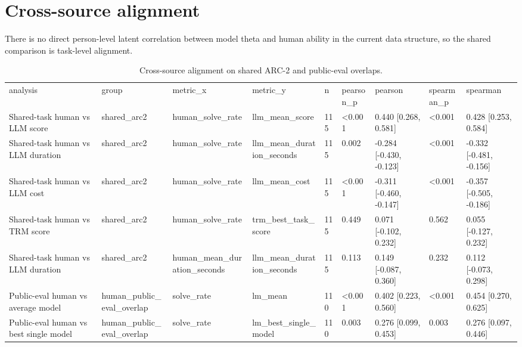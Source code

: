 \documentclass[11pt]{article}
\begin{document}
\section{Cross-source alignment}
There is no direct person-level latent correlation between model theta and human ability in the current data structure, so the shared comparison is task-level alignment.
\begin{table}[htbp]
\centering
\caption{Cross-source alignment on shared ARC-2 and public-eval overlaps.}
\label{tab:cross_source}
\begin{tabular}{lllllllll}
\toprule
analysis & group & metric\_x & metric\_y & n & pearson\_p & pearson & spearman\_p & spearman \\
Shared-task human vs LLM score & shared\_arc2 & human\_solve\_rate & llm\_mean\_score & 115 & <0.001 & 0.440 [0.268, 0.581] & <0.001 & 0.428 [0.253, 0.584] \\
Shared-task human vs LLM duration & shared\_arc2 & human\_solve\_rate & llm\_mean\_duration\_seconds & 115 & 0.002 & -0.284 [-0.430, -0.123] & <0.001 & -0.332 [-0.481, -0.156] \\
Shared-task human vs LLM cost & shared\_arc2 & human\_solve\_rate & llm\_mean\_cost & 115 & <0.001 & -0.311 [-0.460, -0.147] & <0.001 & -0.357 [-0.505, -0.186] \\
Shared-task human vs TRM score & shared\_arc2 & human\_solve\_rate & trm\_best\_task\_score & 115 & 0.449 & 0.071 [-0.102, 0.232] & 0.562 & 0.055 [-0.127, 0.232] \\
Shared-task human vs LLM duration & shared\_arc2 & human\_mean\_duration\_seconds & llm\_mean\_duration\_seconds & 115 & 0.113 & 0.149 [-0.087, 0.360] & 0.232 & 0.112 [-0.073, 0.298] \\
Public-eval human vs average model & human\_public\_eval\_overlap & solve\_rate & lm\_mean & 110 & <0.001 & 0.402 [0.223, 0.560] & <0.001 & 0.454 [0.270, 0.625] \\
Public-eval human vs best single model & human\_public\_eval\_overlap & solve\_rate & lm\_best\_single\_model & 110 & 0.003 & 0.276 [0.099, 0.453] & 0.003 & 0.276 [0.097, 0.446] \\
\bottomrule
\end{tabular}
\end{table}
\end{document}

